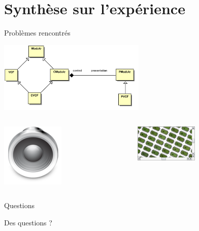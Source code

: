 \documentclass[frenchb]{beamer}
\begin{document}
\section{Synthèse sur l’expérience}

\begin{frame}{Problèmes rencontrés}
    \begin{center}
        \includegraphics[width=7cm]{../img/ps/pacmodule-psm.pdf}
    \end{center}
    \pause
    \begin{columns}
        \begin{column}[l]{7cm}
        \includegraphics[width=3cm]{../img/png/arts128x128.png}
        \end{column}
        \pause
        \begin{column}[r]{4cm}
        \includegraphics[width=3cm]{../img/png/graphicsview-view.png}
        \end{column}
    \end{columns}
\end{frame}

\begin{frame}{Questions}
    \begin{center}
        Des questions ?
    \end{center}
\end{frame}
\end{document}
